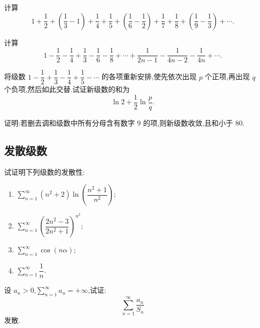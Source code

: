 \documentclass[../../数学分析培优讲义.tex]{subfiles}
\begin{document}
\begin{example}
计算
\[
    1+\dfrac{1}{2}+\left(\dfrac{1}{3}-1\right)+\dfrac{1}{4}+\dfrac{1}{5}
    +\left(\dfrac{1}{6}-\dfrac{1}{2}\right)+\dfrac{1}{7}+\dfrac{1}{8}
    +\left(\dfrac{1}{9}-\dfrac{1}{3}\right)+\cdots.
\]
\end{example}
\exampleblank

\begin{example}
计算
\[
    1-\dfrac{1}{2}-\dfrac{1}{4}+\dfrac{1}{3}-\dfrac{1}{6}-\dfrac{1}{8}
    +\cdots+\dfrac{1}{2n-1}-\dfrac{1}{4n-2}-\dfrac{1}{4n}+\cdots.
\]
\end{example}
\exampleblank

\begin{example}
将级数 $\displaystyle1-\dfrac{1}{2}+\dfrac{1}{3}-\dfrac{1}{4}+\dfrac{1}{5}-\cdots$ 的各项重新安排,使先依次出现 $p$ 个正项,再出现 $q$ 个负项,然后如此交替.试证新级数的和为
\[
    \ln2+\dfrac{1}{2}\ln\dfrac{p}{q}.
\]
\end{example}
\exampleblank

\begin{example}
证明:若删去调和级数中所有分母含有数字 $9$ 的项,则新级数收敛,且和小于 $80$.
\end{example}
\exampleblank



\subsection{发散级数}

\begin{example}
试证明下列级数的发散性:
\begin{enumerate}[label=(\arabic*)]
    \item $\displaystyle\sum\limits_{n=1}^{\infty}(n^2+2)\ln\left(\dfrac{n^2+1}{n^2}\right)$;
    \item $\displaystyle\sum\limits_{n=1}^{\infty}\left(\dfrac{2n^2-3}{2n^2+1}\right)^{n^2}$;
    \item $\displaystyle\sum\limits_{n=1}^{\infty}\cos(n\alpha)$;
    \item $\displaystyle\sum\limits_{n=1}^{\infty}\dfrac{1}{n}$.
\end{enumerate}
\end{example}
\exampleblank

\begin{example}
设 $a_n>0$,$\displaystyle\sum\limits_{n=1}^{\infty}a_n=+\infty$,试证:
\[
    \sum\limits_{n=1}^{\infty}\dfrac{a_n}{S_n}
\]
发散.
\end{example}
\exampleblank
\end{document}
